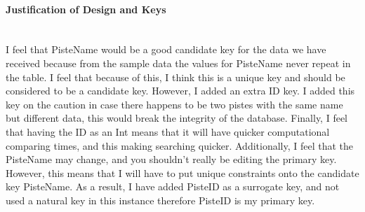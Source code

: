 \documentclass[12pt]{article}
\begin{document}
\paragraph{Justification of Design and Keys}\mbox{}\\
I feel that PisteName would be a good candidate key for the data we have received because from the sample data the values for PisteName never repeat in the table. I feel that because of this, I think this is a unique key and should be considered to be a candidate key. However, I added an extra ID key. I added this key on the caution in case there happens to be two pistes with the same name but different data, this would break the integrity of the database. Finally, I feel that having the ID as an Int means that it will have quicker computational comparing times, and this making searching quicker. Additionally, I feel that the PisteName may change, and you shouldn't really be editing the primary key. However, this means that I will have to put unique constraints onto the candidate key PisteName. As a result, I have added PisteID as a surrogate key, and not used a natural key in this instance therefore PisteID is my primary key.
\end{document}

